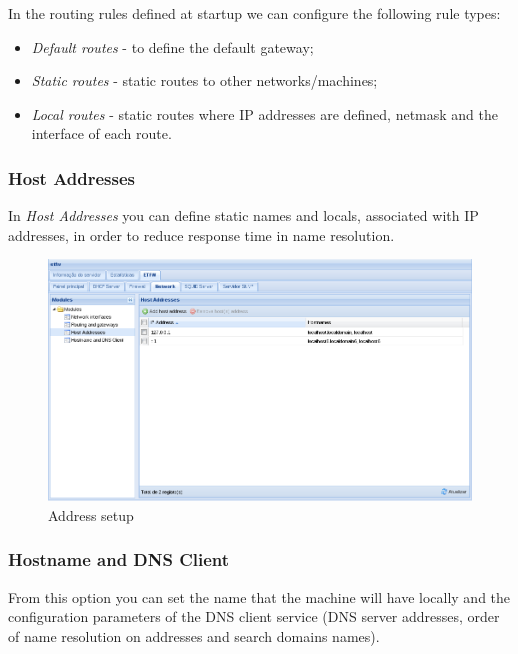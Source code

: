 In the routing rules defined at startup we can configure the following rule types:
\begin{itemize}
    \item \textit{Default routes} - to define the default gateway;
    \item \textit{Static routes} - static routes to other networks/machines;
    \item \textit{Local routes} - static routes where IP addresses are defined, netmask and the interface of each route.
\end{itemize}

\subsubsection{Host Addresses}
In \textit{Host Addresses} you can define static names and locals, associated with IP addresses, in order to reduce response time in name resolution.

\begin{figure}[H]
    \begin{center}
    \includegraphics[scale=0.38]{screenshots/etfw/etfw_network_hostaddresses_01.png}
    \caption{Address setup}
    \label{fig:etfw_network_hostaddresses_01}
    \end{center}
\end{figure}

\subsubsection{Hostname and DNS Client}
From this option you can set the name that the machine will have locally and the configuration parameters of the DNS client service (DNS server addresses, order of name resolution on addresses and search domains names).

